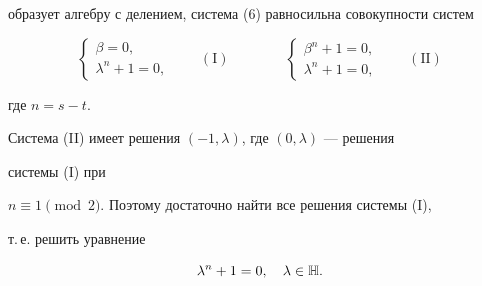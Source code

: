 образует алгебру с делением, система (6) равносильна совокупности систем 


$$ 


\begin{cases} 


\beta=0,\\ 


\lambda^n+1=0, 


\end{cases} 


\qquad (\mathrm I) 


\qquad\qquad 


\begin{cases} 


\beta^n+1=0,\\ 


\lambda^n+1=0, 


\end{cases} 


\qquad (\mathrm {II}) 


$$ 


где $n=s-t$. 


 


Система (II) имеет решения $(-1,\lambda)$, где $(0,\lambda)$ --- решения 


системы (I) при 


$n\equiv 1\pmod{2}$. Поэтому достаточно найти все решения системы (I),


т.\,е. решить уравнение 


\begin{equation} 


\lambda^n+1=0,\quad \lambda\in \Bbb H. 


\end{equation} 


 


